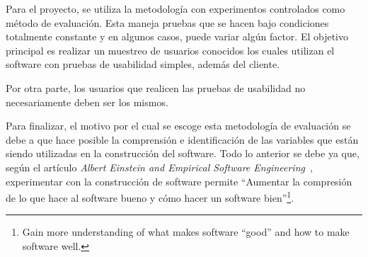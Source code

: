 Para el proyecto, se utiliza la metodología con experimentos controlados como método de evaluación. Esta maneja pruebas que se hacen bajo condiciones totalmente constante y en algunos casos, puede variar algún factor. El objetivo principal es realizar un muestreo de usuarios conocidos los cuales utilizan el software con pruebas de usabilidad simples, además del cliente.

Por otra parte, los usuarios que realicen las pruebas de usabilidad no necesariamente deben ser los mismos.

Para finalizar, el motivo por el cual se escoge esta metodología de evaluación se debe a que hace posible la comprensión e identificación de las variables que están siendo utilizadas en la construcción del software.  Todo lo anterior se debe ya que, según el artículo \emph{Albert Einstein and Empirical Software Engineering}~\cite{8}, experimentar con la construcción de software permite ``Aumentar la compresión de lo que hace al software bueno y cómo hacer un software bien''\footnote{Gain more understanding of what makes software ``good'' and how to make software well.}.